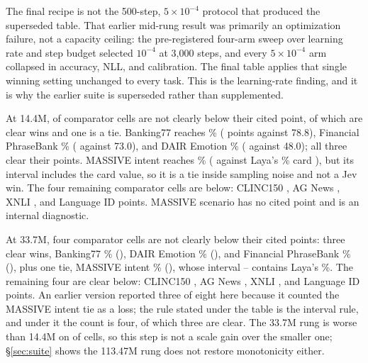 The final recipe is not the 500-step, \(5\times10^{-4}\) protocol that produced
the superseded table. That earlier mid-rung result was primarily an optimization
failure, not a capacity ceiling: the pre-registered four-arm sweep over learning
rate and step budget selected \(10^{-4}\) at 3{,}000 steps, and every
\(5\times10^{-4}\) arm collapsed in accuracy, NLL, and calibration. The final
table applies that single winning setting unchanged to every task. This is the
learning-rate finding, and it is why the earlier suite is superseded rather than
supplemented.

At 14.4M, \SuiteSmallAtOrAboveThree{} of \SuiteComparatorCells{} comparator
cells are not clearly below their cited point, of which \SuiteSmallClear{} are
clear wins and one is a tie. Banking77 reaches \SuiteSmallBank\%
(\SuiteSmallGapBank{} points against 78.8), Financial PhraseBank
\SuiteSmallFinancial\% (\SuiteSmallGapFinancial{} against 73.0), and DAIR
Emotion \SuiteSmallEmotion\% (\SuiteSmallGapEmotion{} against 48.0); all three
clear their points. MASSIVE intent reaches \SuiteSmallMassiveIntent\%
(\SuiteSmallGapMassiveIntent{} against Laya's \SuiteCitedMassiveIntent\% card
\citep{laya2026card}),
but its interval includes the card value, so it is a tie inside sampling noise
and not a Jev win. The four remaining comparator cells are below: CLINC150
\SuiteSmallGapClinc, AG News \SuiteSmallGapAg, XNLI \SuiteSmallGapXnli, and
Language ID \SuiteSmallGapLang{} points. MASSIVE scenario has no cited point and
is an internal diagnostic.

At 33.7M, four comparator cells are not clearly below their cited points: three
clear wins, Banking77 \SuiteMidBank\% (\SuiteMidGapBank{}), DAIR Emotion
\SuiteMidEmotion\% (\SuiteMidGapEmotion{}), and Financial PhraseBank
\SuiteMidFinancial\% (\SuiteMidGapFinancial{}), plus one tie, MASSIVE intent
\SuiteMidMassiveIntent\% (\SuiteMidGapMassiveIntent), whose interval
\SuiteMidMassiveIntentLo--\SuiteMidMassiveIntentHi{} contains Laya's
\SuiteCitedMassiveIntent\%. The remaining four are clear below: CLINC150
\SuiteMidGapClinc, AG News \SuiteMidGapAg, XNLI \SuiteMidGapXnli, and Language ID
\SuiteMidGapLang{} points. An earlier version reported three of eight here because
it counted the MASSIVE intent tie as a loss; the rule stated under the table is
the interval rule, and under it the count is four, of which three are clear. The
33.7M rung is worse than 14.4M on \SuiteLargerWorse{} of \SuiteTasks{} cells, so
this step is not a scale gain over the smaller one; \S\ref{sec:suite} shows the
113.47M rung does not restore monotonicity either.


